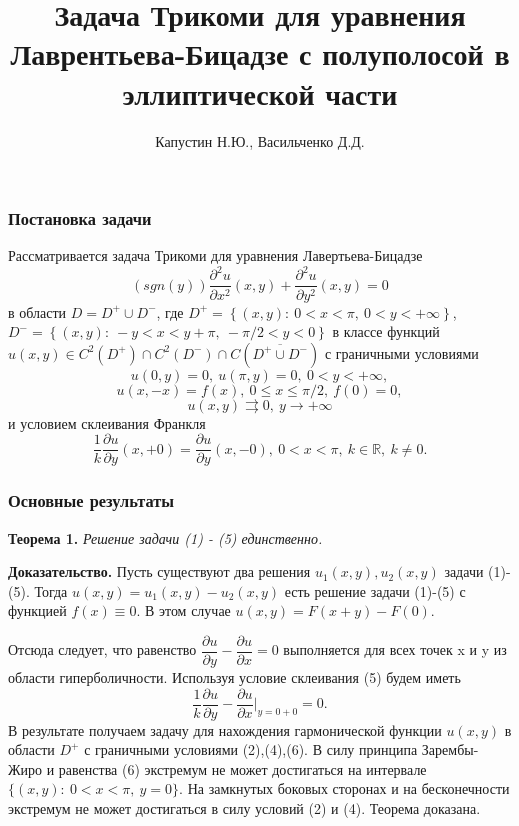 \documentclass{beamer}
\title{Задача Трикоми для уравнения Лаврентьева-Бицадзе с полуполосой в эллиптической части}
\author{Капустин Н.Ю., Васильченко Д.Д.}
\date{}
\begin{document}
	
	\frame{\titlepage}
	
\begin{frame}
	\frametitle{Постановка задачи}
	Рассматривается задача Трикоми для уравнения Лавертьева-Бицадзе
	\begin{equation}
		\left(sgn (y)\right) \dfrac{\partial^2 u}{\partial x^2}(x,y) + \dfrac{\partial^2 u}{\partial y^2}(x,y) = 0
	\end{equation}
	в области $D = D^{+} \cup D^{-}$, где $D^{+} = \left\{(x,y): \ 0 < x < \pi, \ 0 < y < + \infty \right\}$, $D^{-} = \left\{(x,y): \ -y < x < y + \pi, \ -\pi/2 < y < 0\right\}$ в классе функций $u(x,y) \in C^2(D^{+}) \cap C^2(D^{-}) \cap C(\overline{D^{+} \cup D^{-}})$ с граничными условиями
	\begin{equation}
		u(0,y) = 0, \ u(\pi, y) = 0, \ 0 < y < + \infty,
	\end{equation}
	\begin{equation}
		u(x,-x) = f(x) , \ 0 \leq x \leq \pi/2, \ f(0) = 0, 
	\end{equation}
	\begin{equation}
		u(x,y) \rightrightarrows 0, \ y \to +\infty
	\end{equation}
	и условием склеивания Франкля 
	\begin{equation}
		\dfrac1{k} \dfrac{\partial u}{\partial y}(x, +0) = \dfrac{\partial u}{\partial y} (x, -0), \ 0 < x < \pi,\ k \in \mathbb{R},\ k \neq 0.
	\end{equation}
\end{frame}
\begin{frame}
	\frametitle{Основные результаты}
	\par
	\textbf{Теорема 1.} \textit{Решение задачи (1) - (5) единственно.}
	
	\textbf{Доказательство.} 
	Пусть существуют два решения $u_1(x,y), u_2(x,y)$ задачи (1)-(5). Тогда $u(x,y) = u_1(x,y) - u_2(x,y)$ есть решение задачи (1)-(5) с функцией $f(x) \equiv 0$. В этом случае $u(x,y) = F(x+y) - F(0)$.
	
	Отсюда следует, что равенство $\dfrac{\partial u}{\partial y} - \dfrac{\partial u}{\partial x} = 0$ выполняется для всех точек x и y из области гиперболичности. Используя условие склеивания  (5) будем иметь
	\begin{equation}
		\dfrac1{k} \dfrac{\partial u}{\partial y} - \dfrac{\partial u}{\partial x}\vert_{y=0+0} = 0.
	\end{equation}
	В результате получаем задачу для нахождения гармонической функции $u(x,y)$ в области $D^{+}$ с граничными условиями (2),(4),(6).
	В силу принципа Зарембы-Жиро и равенства (6) экстремум не может достигаться на интервале $\{(x,y):\ 0 < x < \pi, \ y = 0\}$. На замкнутых боковых сторонах и на бесконечности экстремум не может достигаться в силу условий (2) и (4). Теорема доказана.
\end{frame}
\end{document}
